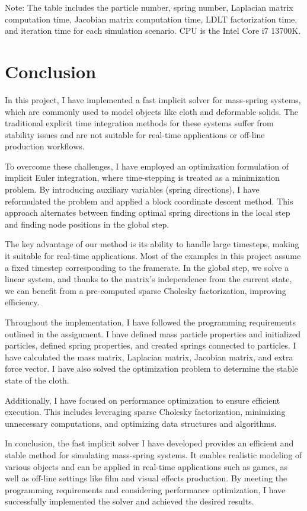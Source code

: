 \documentclass[acmtog]{acmart}
\begin{document}
Note: The table includes the particle number, spring number, Laplacian matrix computation time, Jacobian matrix computation time, LDLT factorization time, and iteration time for each simulation scenario. CPU is the Intel Core i7 13700K.

\section{Conclusion}

In this project, I have implemented a fast implicit solver for mass-spring systems, which are commonly used to model objects like cloth and deformable solids. The traditional explicit time integration methods for these systems suffer from stability issues and are not suitable for real-time applications or off-line production workflows.

To overcome these challenges, I have employed an optimization formulation of implicit Euler integration, where time-stepping is treated as a minimization problem. By introducing auxiliary variables (spring directions), I have reformulated the problem and applied a block coordinate descent method. This approach alternates between finding optimal spring directions in the local step and finding node positions in the global step.

The key advantage of our method is its ability to handle large timesteps, making it suitable for real-time applications. Most of the examples in this project assume a fixed timestep corresponding to the framerate. In the global step, we solve a linear system, and thanks to the matrix's independence from the current state, we can benefit from a pre-computed sparse Cholesky factorization, improving efficiency.

Throughout the implementation, I have followed the programming requirements outlined in the assignment. I have defined mass particle properties and initialized particles, defined spring properties, and created springs connected to particles. I have calculated the mass matrix, Laplacian matrix, Jacobian matrix, and extra force vector. I have also solved the optimization problem to determine the stable state of the cloth.

Additionally, I have focused on performance optimization to ensure efficient execution. This includes leveraging sparse Cholesky factorization, minimizing unnecessary computations, and optimizing data structures and algorithms.

In conclusion, the fast implicit solver I have developed provides an efficient and stable method for simulating mass-spring systems. It enables realistic modeling of various objects and can be applied in real-time applications such as games, as well as off-line settings like film and visual effects production. By meeting the programming requirements and considering performance optimization, I have successfully implemented the solver and achieved the desired results.
\end{document}
